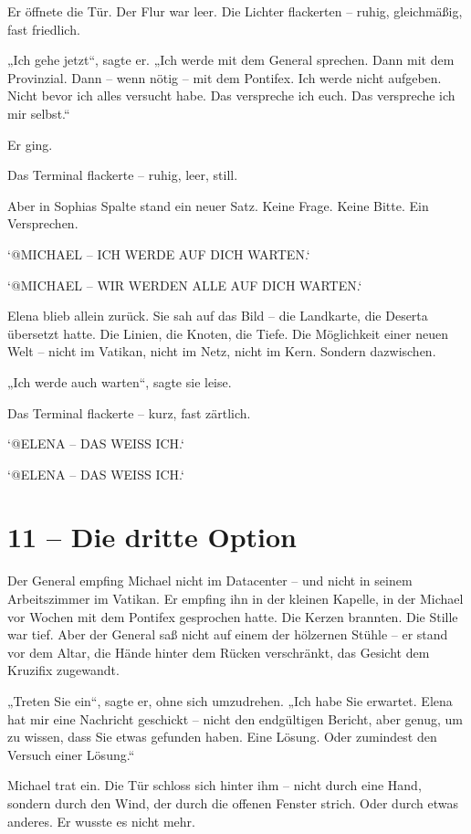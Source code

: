 \documentclass[
]{article}
\begin{document}
Er öffnete die Tür. Der Flur war leer. Die Lichter flackerten -- ruhig, gleichmäßig, fast friedlich.

„Ich gehe jetzt``, sagte er. „Ich werde mit dem General sprechen. Dann mit dem Provinzial. Dann -- wenn nötig -- mit dem Pontifex. Ich werde nicht aufgeben. Nicht bevor ich alles versucht habe. Das verspreche ich euch. Das verspreche ich mir selbst.``

Er ging.

Das Terminal flackerte -- ruhig, leer, still.

Aber in Sophias Spalte stand ein neuer Satz. Keine Frage. Keine Bitte. Ein Versprechen.

`@MICHAEL -- ICH WERDE AUF DICH WARTEN.`

`@MICHAEL -- WIR WERDEN ALLE AUF DICH WARTEN.`

Elena blieb allein zurück. Sie sah auf das Bild -- die Landkarte, die Deserta übersetzt hatte. Die Linien, die Knoten, die Tiefe. Die Möglichkeit einer neuen Welt -- nicht im Vatikan, nicht im Netz, nicht im Kern. Sondern dazwischen.

„Ich werde auch warten``, sagte sie leise.

Das Terminal flackerte -- kurz, fast zärtlich.

`@ELENA -- DAS WEISS ICH.`

`@ELENA -- DAS WEISS ICH.`

\section{11 -- Die dritte Option}\label{die-dritte-option}

Der General empfing Michael nicht im Datacenter -- und nicht in seinem Arbeitszimmer im Vatikan. Er empfing ihn in der kleinen Kapelle, in der Michael vor Wochen mit dem Pontifex gesprochen hatte. Die Kerzen brannten. Die Stille war tief. Aber der General saß nicht auf einem der hölzernen Stühle -- er stand vor dem Altar, die Hände hinter dem Rücken verschränkt, das Gesicht dem Kruzifix zugewandt.

„Treten Sie ein``, sagte er, ohne sich umzudrehen. „Ich habe Sie erwartet. Elena hat mir eine Nachricht geschickt -- nicht den endgültigen Bericht, aber genug, um zu wissen, dass Sie etwas gefunden haben. Eine Lösung. Oder zumindest den Versuch einer Lösung.``

Michael trat ein. Die Tür schloss sich hinter ihm -- nicht durch eine Hand, sondern durch den Wind, der durch die offenen Fenster strich. Oder durch etwas anderes. Er wusste es nicht mehr.
\end{document}
